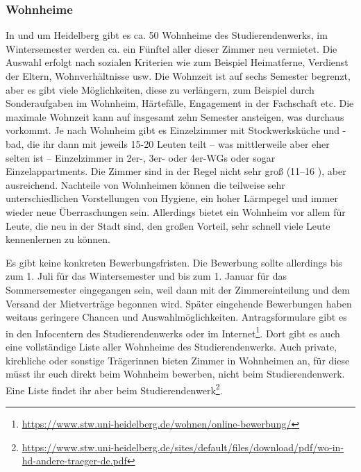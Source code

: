 \subsubsection{Wohnheime}


In und um Heidelberg gibt es ca. 50 Wohnheime des Studierendenwerks, im Wintersemester werden ca. ein Fünftel aller dieser Zimmer neu vermietet. Die Auswahl erfolgt nach sozialen Kriterien wie zum Beispiel Heimatferne, Verdienst der Eltern, Wohnverhältnisse usw. Die Wohnzeit ist auf sechs Semester begrenzt, aber es gibt viele Möglichkeiten, diese zu verlängern, zum Beispiel durch Sonderaufgaben im Wohnheim, Härtefälle, Engagement in der Fachschaft etc. Die maximale Wohnzeit kann auf insgesamt zehn Semester ansteigen, was durchaus vorkommt. Je nach Wohnheim gibt es Einzelzimmer mit Stockwerksküche und -bad, die ihr dann mit jeweils 15-20 Leuten teilt -- was mittlerweile aber eher selten ist -- Einzelzimmer in 2er-, 3er- oder 4er-WGs oder sogar Einzelappartments. Die Zimmer sind in der Regel nicht sehr groß (11--16 \squaren\metre), aber ausreichend. Nachteile von Wohnheimen können die teilweise sehr unterschiedlichen Vorstellungen von Hygiene, ein hoher Lärmpegel und immer wieder neue Überraschungen sein. Allerdings bietet ein Wohnheim vor allem für Leute, die neu in der Stadt sind, den großen Vorteil, sehr schnell viele Leute kennenlernen zu können.

Es gibt keine konkreten Bewerbungsfristen. Die Bewerbung sollte allerdings bis zum 1. Juli für das Wintersemester und bis zum 1. Januar für das Sommersemester eingegangen sein, weil dann mit der Zimmereinteilung und dem Versand der Mietverträge begonnen wird. Später eingehende Bewerbungen haben weitaus geringere Chancen und Auswahlmöglichkeiten. Antragsformulare gibt es in den Infocentern des Studierendenwerks oder im Internet\footnote{\url{https://www.stw.uni-heidelberg.de/wohnen/online-bewerbung/}}. Dort gibt es auch eine vollständige Liste aller Wohnheime des Studierendenwerks. Auch private, kirchliche oder sonstige Trägerinnen bieten Zimmer in Wohnheimen an, für diese müsst ihr euch direkt beim Wohnheim bewerben, nicht beim Studierendenwerk. Eine Liste findet ihr aber beim Studierendenwerk\footnote{\url{https://www.stw.uni-heidelberg.de/sites/default/files/download/pdf/wo-in-hd-andere-traeger-de.pdf}}.
